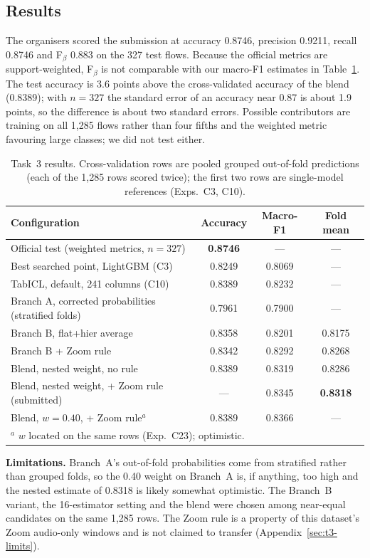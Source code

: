 \subsection{Results}
\label{sec:t3-results}

The organisers scored the submission at accuracy 0.8746, precision 0.9211, recall
0.8746 and F$_\beta$ 0.883 on the 327 test flows. Because the official metrics are
support-weighted, F$_\beta$ is not comparable with our macro-F1 estimates in
Table~\ref{tab:t3-summary}. The test accuracy is 3.6 points above the cross-validated
accuracy of the blend (0.8389); with $n=327$ the standard error of an accuracy near
0.87 is about 1.9 points, so the difference is about two standard errors. Possible
contributors are training on all 1{,}285 flows rather than four fifths and the
weighted metric favouring large classes; we did not test either.

\begin{table}[t]
\caption{Task~3 results. Cross-validation rows are pooled grouped out-of-fold
predictions (each of the 1{,}285 rows scored twice); the first two rows are single-model
references (Exps.~C3, C10).}
\label{tab:t3-summary}
\centering
\small
\begin{tabular}{lccc}
\toprule
Configuration & Accuracy & Macro-F1 & Fold mean \\
\midrule
Official test (weighted metrics, $n=327$) & \textbf{0.8746} & --- & --- \\
\midrule
Best searched point, LightGBM (C3) & 0.8249 & 0.8069 & --- \\
TabICL, default, 241 columns (C10) & 0.8389 & 0.8232 & --- \\
Branch A, corrected probabilities (stratified folds) & 0.7961 & 0.7900 & --- \\
Branch B, flat+hier average & 0.8358 & 0.8201 & 0.8175 \\
Branch B + Zoom rule & 0.8342 & 0.8292 & 0.8268 \\
Blend, nested weight, no rule & 0.8389 & 0.8319 & 0.8286 \\
Blend, nested weight, + Zoom rule (submitted) & --- & 0.8345 & \textbf{0.8318} \\
Blend, $w=0.40$, + Zoom rule$^{a}$ & 0.8389 & 0.8366 & --- \\
\midrule
\multicolumn{4}{l}{\footnotesize $^{a}$ $w$ located on the same rows (Exp.~C23); optimistic.}\\
\bottomrule
\end{tabular}
\end{table}

\noindent\textbf{Limitations.} Branch~A's out-of-fold probabilities come from
stratified rather than grouped folds, so the 0.40 weight on Branch~A is, if anything,
too high and the nested estimate of 0.8318 is likely somewhat optimistic. The Branch~B
variant, the 16-estimator setting and the blend were chosen among near-equal
candidates on the same 1{,}285 rows. The Zoom rule is a property of this dataset's Zoom
audio-only windows and is not claimed to transfer (Appendix~\ref{sec:t3-limits}).
